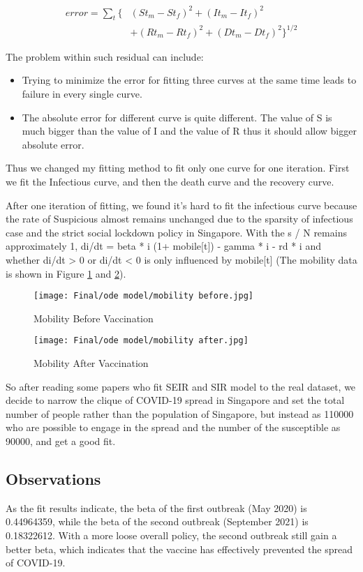 \begin{equation}
\begin{split}
    error =\sum_{t}\bigl\{&(St_{m} - St_{f})^2+(It_{m} - It_{f})^2\\
    &+(Rt_{m} - Rt_{f})^2 +(Dt_{m} - Dt_{f})^2\bigr\}^{1/2}
\end{split}
\end{equation}

The problem within such residual can include:
\begin{itemize}
    \item Trying to minimize the error for fitting three curves at the same time leads to failure in every single curve.
    \item The absolute error for different curve is quite different. The value of S is much bigger than the value of I and the value of R thus it should allow bigger absolute error.
\end{itemize}

Thus we changed my fitting method to fit only one curve for one iteration. First we fit the Infectious curve, and then the death curve and the recovery curve.

After one iteration of fitting, we found it's hard to fit the infectious curve because the rate of Suspicious almost remains unchanged due to the sparsity of infectious case and the strict social lockdown policy in Singapore. With the s / N remains approximately 1, di/dt = beta * i (1+ mobile[t]) - gamma * i - rd * i and whether di/dt > 0 or di/dt < 0  is only influenced by mobile[t] (The mobility data is shown in Figure \ref{sir3} and \ref{sir4}).
\begin{figure}
	\centering
	\texttt{[image: Final/ode model/mobility before.jpg]}
	\caption{Mobility Before Vaccination}
	\label{sir3}
\end{figure}
\begin{figure}
	\centering
	\texttt{[image: Final/ode model/mobility after.jpg]}
	\caption{Mobility After Vaccination}
	\label{sir4}
\end{figure}

So after reading some papers who fit SEIR and SIR model to the real dataset, we decide to narrow the clique of COVID-19 spread in Singapore and set the total number of people rather than the population of Singapore, but instead as 110000 who are possible to engage in the spread and the number of the susceptible as 90000, and get a good fit.

\subsection{Observations}
As the fit results indicate, the beta of the first outbreak (May 2020) is 0.44964359, while the beta of the second outbreak (September 2021) is 0.18322612. With a more loose overall policy, the second outbreak still gain a better beta, which indicates that the vaccine has effectively prevented the spread of COVID-19.







